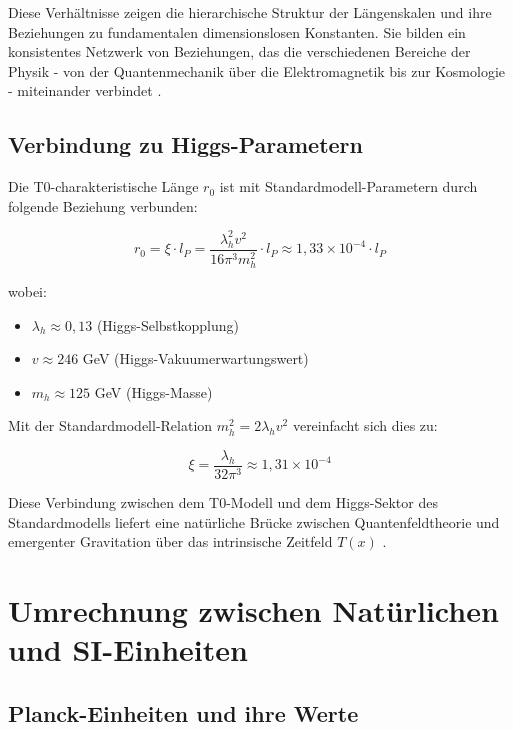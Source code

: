 \documentclass[12pt,a4paper]{article}
\newcommand{\Tfield}{T(x)}
\begin{document}
	Diese Verhältnisse zeigen die hierarchische Struktur der Längenskalen und ihre Beziehungen zu fundamentalen dimensionslosen Konstanten. Sie bilden ein konsistentes Netzwerk von Beziehungen, das die verschiedenen Bereiche der Physik - von der Quantenmechanik über die Elektromagnetik bis zur Kosmologie - miteinander verbindet \cite{pascher_planck_2025}.
	
	\subsection{Verbindung zu Higgs-Parametern}
	
	Die T0-charakteristische Länge $r_0$ ist mit Standardmodell-Parametern durch folgende Beziehung verbunden:
	
	\begin{equation}
		r_0 = \xi \cdot l_P = \frac{\lambda_h^2v^2}{16\pi^3m_h^2} \cdot l_P \approx 1,33 \times 10^{-4} \cdot l_P
	\end{equation}
	
	wobei:
	\begin{itemize}
		\item $\lambda_h \approx 0,13$ (Higgs-Selbstkopplung)
		\item $v \approx 246$ GeV (Higgs-Vakuumerwartungswert)
		\item $m_h \approx 125$ GeV (Higgs-Masse)
	\end{itemize}
	
	Mit der Standardmodell-Relation $m_h^2 = 2\lambda_h v^2$ vereinfacht sich dies zu:
	
	\begin{equation}
		\xi = \frac{\lambda_h}{32\pi^3} \approx 1,31 \times 10^{-4}
	\end{equation}
	
	Diese Verbindung zwischen dem T0-Modell und dem Higgs-Sektor des Standardmodells liefert eine natürliche Brücke zwischen Quantenfeldtheorie und emergenter Gravitation über das intrinsische Zeitfeld $\Tfield$ \cite{pascher_higgs_2025}.
	
	\section{Umrechnung zwischen Natürlichen und SI-Einheiten}
	
	\subsection{Planck-Einheiten und ihre Werte}
	
\end{document}
